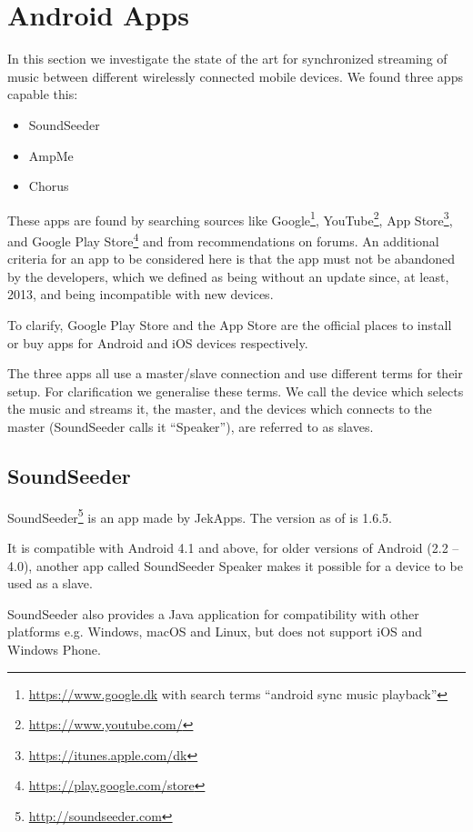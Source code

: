 \section{Android Apps}\label{sec:sota_apps}
In this section we investigate the state of the art for synchronized streaming of music between different wirelessly connected mobile devices.
We found three apps capable this:
\begin{itemize}
    \item SoundSeeder
    \item AmpMe
    \item Chorus
\end{itemize}

These apps are found by searching sources like Google\footnote{\url{https://www.google.dk} with search terms ``android sync music playback''}, YouTube\footnote{\url{https://www.youtube.com/}}, App Store\footnote{\url{https://itunes.apple.com/dk}}, and Google Play Store\footnote{\url{https://play.google.com/store}} and from recommendations on forums.
An additional criteria for an app to be considered here is that the app must not be abandoned by the developers,
which we defined as being without an update since, at least, 2013, and being incompatible with new devices.

To clarify, Google Play Store and the App Store are the official places to install or buy apps for Android and iOS devices respectively.

The three apps all use a master/slave connection and use different terms for their setup.
For clarification we generalise these terms.
We call the device which selects the music and streams it, the master, and the devices which connects to the master (SoundSeeder calls it ``Speaker''), are referred to as slaves.

\subsection{SoundSeeder}\label{subsec:soundseeder}
SoundSeeder\footnote{\url{http://soundseeder.com}} is an app made by JekApps.
The  version as of  is 1.6.5.

It is compatible with Android 4.1 and above, for older versions of Android (2.2 -- 4.0),
another app called SoundSeeder Speaker makes it possible for a device to be used as a slave.

SoundSeeder also provides a Java application for compatibility with other platforms e.g. Windows, macOS and Linux, but does not support iOS and Windows Phone\cite{soundseeder_ios}.

